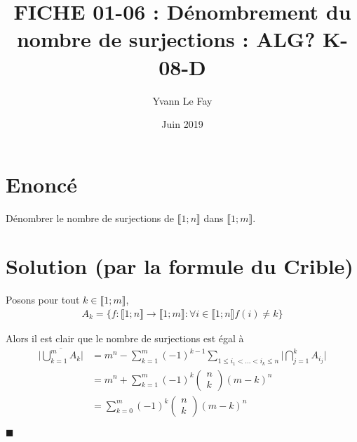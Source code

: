 \documentclass{article}
\newcommand*{\QED}{\hfill\ensuremath{\blacksquare}}%
\begin{document}
\title{FICHE 01-06 : Dénombrement du nombre de surjections : ALG? K-08-D}
\author{Yvann Le Fay}
\date{Juin 2019}
\maketitle
\section*{Enoncé}
Dénombrer le nombre de surjections de $\llbracket 1;n\rrbracket$ dans $\llbracket 1;m\rrbracket$.
\section*{Solution (par la formule du Crible)}
Posons pour tout $k\in\llbracket 1;m\rrbracket$,
\begin{align*}
A_k = \{f : \llbracket 1;n\rrbracket \to \llbracket 1;m\rrbracket : \forall i\in\llbracket 1;n\rrbracket f(i) \neq k\}
\end{align*}

Alors il est clair que le nombre de surjections est égal à 
\begin{align*}
\bigg|\overline{\bigcup_{k=1}^m A_k}\bigg| & = m^n - \sum_{k=1}^m (-1)^{k-1}\sum_{1\leq i_1<\ldots<i_k\leq n}\bigg|\bigcap_{j=1}^kA_{i_j}\bigg|\\
&=m^n +\sum_{k=1}^m (-1)^k \begin{pmatrix}
n\\k
\end{pmatrix} (m-k)^n\\
&=\sum_{k=0}^m (-1)^k \begin{pmatrix}
n\\k
\end{pmatrix}
(m-k)^n 
\end{align*}


\QED
\end{document}
